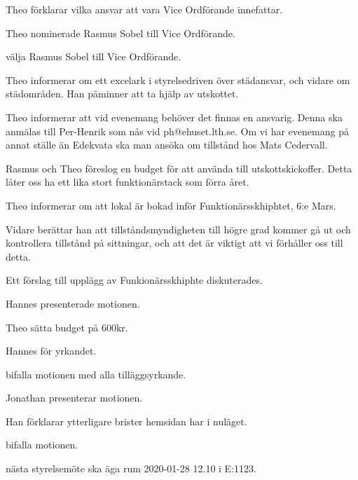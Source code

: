 \documentclass[10pt]{article}
\begin{document}
\begin{paragrafer}
Theo förklarar vilka ansvar att vara Vice Ordförande innefattar.

Theo nominerade Rasmus Sobel till Vice Ordförande.

\Mba välja Rasmus Sobel till Vice Ordförande.


Theo informerar om ett excelark i styrelsedriven över städansvar, och vidare om städområden. Han påminner att ta hjälp av utskottet.


Theo informerar att vid evenemang behöver det finnas en ansvarig. Denna ska anmälas till Per-Henrik som nås vid ph@ehuset.lth.se. Om vi har evenemang på annat ställe än Edekvata ska man ansöka om tillstånd hos Mats Cedervall.


Rasmus och Theo föreslog en budget för att använda till utskottskickoffer. Detta låter oss ha ett lika stort funktionärstack som förra året.


Theo informerar om att lokal är bokad inför Funktionärsskhiphtet, 6:e Mars.

Vidare berättar han att tillståndsmyndigheten till högre grad kommer gå ut och kontrollera tillstånd på sittningar, och att det är viktigt att vi förhåller oss till detta.

Ett förslag till upplägg av Funkionärsskhiphte diskuterades.


Hannes presenterade motionen.

\Mdf

Theo \ypa sätta budget på 600kr.

Hannes \js för yrkandet.

\Mba bifalla motionen med alla tilläggsyrkande.


Jonathan presenterar motionen.

Han förklarar ytterligare brister hemsidan har i nuläget.

\Mdf

\Mba bifalla motionen.



\Mba nästa styrelsemöte ska äga rum 2020-01-28 12.10 i E:1123.


\end{paragrafer}
\end{document}
